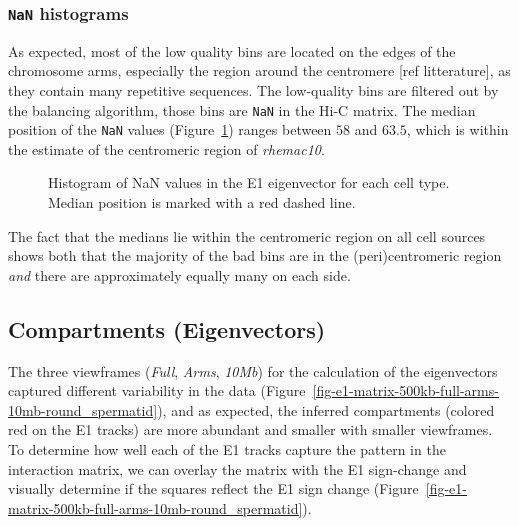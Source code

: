 \documentclass[
  11pt,
  a4paper,
]{scrbook}
\let\oldemph\emph
\renewcommand\emph[1]{\oldemph{\color{gray}#1}}
\begin{document}
\subsubsection{\texorpdfstring{\texttt{NaN}
histograms}{NaN histograms}}\label{nan-histograms}

As expected, most of the low quality bins are located on the edges of
the chromosome arms, especially the region around the centromere {[}ref
litterature{]}, as they contain many repetitive sequences. The
low-quality bins are filtered out by the balancing algorithm, those bins
are \texttt{NaN} in the Hi-C matrix. The median position of the
\texttt{NaN} values (Figure~\ref{fig-e1_nan_hist}) ranges between \(58\)
and \(63.5\), which is within the estimate of the centromeric region of
\emph{rhemac10}.

\begin{figure}[H]


\caption{\label{fig-e1_nan_hist}Histogram of NaN values in the E1
eigenvector for each cell type. Median position is marked with a red
dashed line.}

\end{figure}%

The fact that the medians lie within the centromeric region on all cell
sources shows both that the majority of the bad bins are in the
(peri)centromeric region \emph{and} there are approximately equally many
on each side.

\subsection{Compartments (Eigenvectors)}\label{sec-results-eigenvectors}

The three viewframes (\emph{Full}, \emph{Arms}, \emph{10Mb}) for the
calculation of the eigenvectors captured different variability in the
data (Figure~\ref{fig-e1-matrix-500kb-full-arms-10mb-round_spermatid}),
and as expected, the inferred compartments (colored red on the E1
tracks) are more abundant and smaller with smaller viewframes. To
determine how well each of the E1 tracks capture the pattern in the
interaction matrix, we can overlay the matrix with the E1 sign-change
and visually determine if the squares reflect the E1 sign change
(Figure~\ref{fig-e1-matrix-500kb-full-arms-10mb-round_spermatid}).
\end{document}
